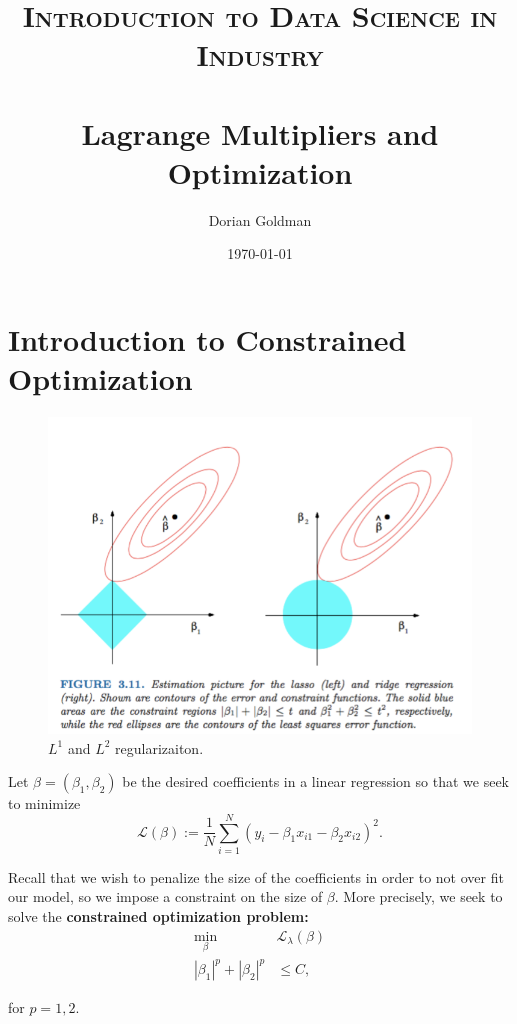 \documentclass[paper=a4, fontsize=11pt]{scrartcl} %
\title{	
\normalfont \normalsize 
\textsc{Introduction to Data Science in Industry} \\ [25pt] %
\horrule{0.5pt} \\[0.4cm] %
\huge Lagrange Multipliers and Optimization %
\horrule{2pt} \\[0.5cm] %
}
\author{Dorian Goldman} %
\date{\normalsize\today} %
\numberwithin{equation}{section} %
\numberwithin{figure}{section} %
\numberwithin{table}{section} %
\begin{document}
\maketitle %

\section{Introduction to Constrained Optimization}
\begin{figure}
  \includegraphics[width=\linewidth]{../img/regularization.png}
  \caption{$L^1$ and $L^2$ regularizaiton.}
  \label{reg}
  \end{figure}
 
Let $\beta = (\beta_1, \beta_2)$ be the desired coefficients in a linear regression so that we seek to minimize
\begin{equation}
\mathcal{L}(\beta) := \frac{1}{N} \sum_{i=1}^N (y_i - \beta_1 x_{i1} - \beta_2 x_{i2})^2.
\end{equation}

Recall that we wish to penalize the size of the coefficients in order to not over fit our model, so we impose a constraint on the size of $\beta$. More precisely, we seek to solve the \textbf{constrained optimization problem:}
\begin{align}
\min_{\beta}\; &\mathcal{L}_{\lambda} (\beta) \\
|\beta_1|^p + |\beta_2|^p &\leq C,
\end{align}

for $p=1, 2$. \\\\
\end{document}

